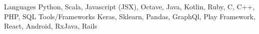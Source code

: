 \begin{cvskills}
  \cvskill
    {Languages}
    {
      Python, Scala, Javascript (JSX), Octave, Java, Kotlin, Ruby, C, C++, PHP, SQL
    }
  \cvskill
    {Tools/Frameworks}
    {
      Keras, Sklearn, Pandas, GraphQl, Play Framework, React, Android, RxJava, Rails
    }
  \vspace{-3mm}
\end{cvskills}